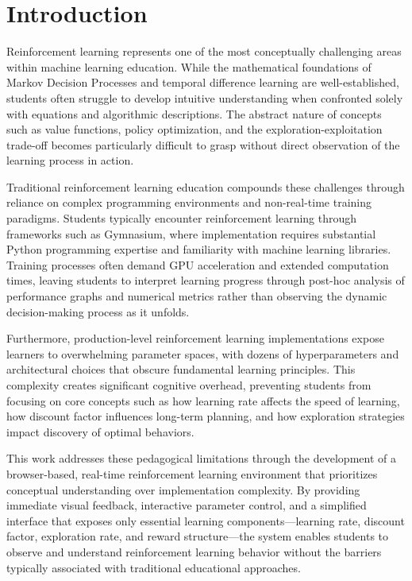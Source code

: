 \section{Introduction}

Reinforcement learning represents one of the most conceptually challenging areas within machine learning education. While the mathematical foundations of Markov Decision Processes and temporal difference learning are well-established, students often struggle to develop intuitive understanding when confronted solely with equations and algorithmic descriptions. The abstract nature of concepts such as value functions, policy optimization, and the exploration-exploitation trade-off becomes particularly difficult to grasp without direct observation of the learning process in action.

Traditional reinforcement learning education compounds these challenges through reliance on complex programming environments and non-real-time training paradigms. Students typically encounter reinforcement learning through frameworks such as Gymnasium\cite{gymnasium2023}, where implementation requires substantial Python programming expertise and familiarity with machine learning libraries. Training processes often demand GPU acceleration and extended computation times, leaving students to interpret learning progress through post-hoc analysis of performance graphs and numerical metrics rather than observing the dynamic decision-making process as it unfolds.

Furthermore, production-level reinforcement learning implementations expose learners to overwhelming parameter spaces, with dozens of hyperparameters and architectural choices that obscure fundamental learning principles. This complexity creates significant cognitive overhead, preventing students from focusing on core concepts such as how learning rate affects the speed of learning, how discount factor influences long-term planning, and how exploration strategies impact discovery of optimal behaviors.

This work addresses these pedagogical limitations through the development of a browser-based, real-time reinforcement learning environment that prioritizes conceptual understanding over implementation complexity. By providing immediate visual feedback, interactive parameter control, and a simplified interface that exposes only essential learning components—learning rate, discount factor, exploration rate, and reward structure—the system enables students to observe and understand reinforcement learning behavior without the barriers typically associated with traditional educational approaches.